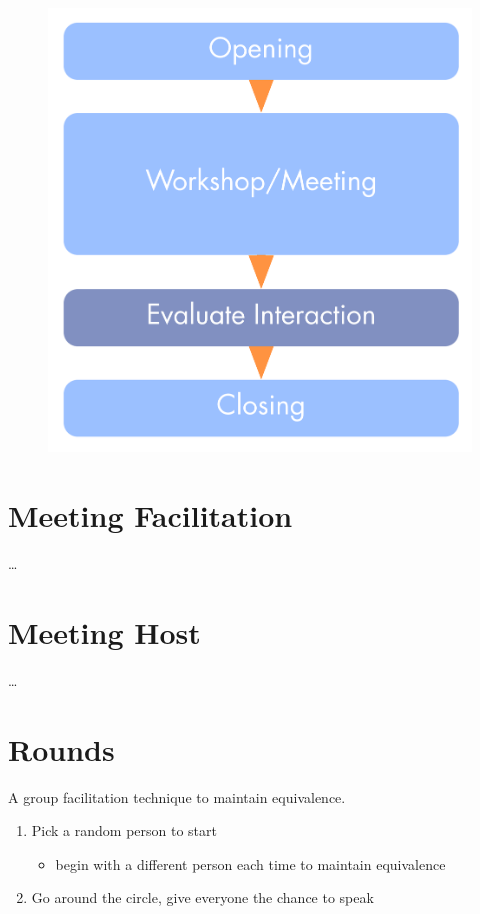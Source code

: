 \begin{figure}[htbp]
\centering
\includegraphics[keepaspectratio,width=\textwidth,height=0.75\textheight]{img/meetings/evaluate-interactions.png}
\end{figure}

\section{Meeting Facilitation}
\label{meetingfacilitation}

{\ldots}

\section{Meeting Host}
\label{meetinghost}

{\ldots}

\section{Rounds}
\label{rounds}

A group facilitation technique to maintain equivalence.

\begin{enumerate}
\item Pick a random person to start

\begin{itemize}
\item begin with a different person each time to maintain equivalence

\end{itemize}

\item Go around the circle, give everyone the chance to speak

\end{enumerate}

